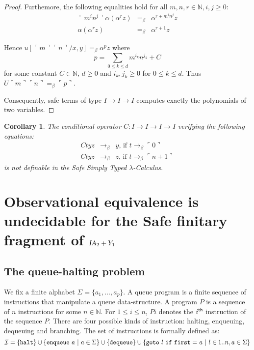 \documentclass{article}
\newtheorem{corollary}[theorem]{Corollary}
\newcommand{\encode}[1]{\ulcorner #1 \urcorner}
\newcommand{\nat}{\mathbb{N}}
\newcommand\ialgol{{\textsl{IA}}}
\begin{document}
\begin{proof}
Furthemore, the following equalities hold for all $m,n,r\in \nat,i,j\geq 0$:
\begin{eqnarray*}
\encode{m^i n^j} \alpha (\alpha^r z) &=_\beta&
\alpha^{r + m^i n^j} z \\
\alpha ( \alpha^r z ) &=_\beta& \alpha^{r+1} z
\end{eqnarray*}

Hence $u[\encode{m} \encode{n}/x,y] =_\beta \alpha^p z$ where
$$ p = \sum_{0\leq k \leq d} m^{i_k} n^{j_k} + C$$
for some constant $C \in \nat$, $d\geq 0$ and $i_k,j_k \geq 0$ for $0 \leq k \leq d$. Thus $U \encode{m} \encode{n} =_\beta \encode{p}$. 

Consequently, safe terms of type $I \rightarrow I \rightarrow I$ computes
exactly the polynomials of two variables.
\end{proof}

\begin{corollary}
The conditional operator $C:I\rightarrow I\rightarrow I \rightarrow I$ verifying the following equations:
\begin{eqnarray*}
C t y z &\rightarrow_\beta& y \mbox{, if } t \rightarrow_\beta \encode{0} \\
C t y z &\rightarrow_\beta& z \mbox{, if } t \rightarrow_\beta \encode{n+1}
\end{eqnarray*}
is not definable in the Safe Simply Typed $\lambda$-Calculus.
\end{corollary}



\section{Observational equivalence is undecidable for the Safe finitary fragment of $\ialgol_2 + Y_1$}

\subsection{The queue-halting problem}
We fix a finite alphabet $\Sigma = \{ a_1, \ldots, a_p \}$. A queue program is a finite sequence of instructions that manipulate a queue data-structure. 
A program $P$ is a sequence of $n$ instructions for some $n\in \nat$. For $1 \leq i \leq n$, $P i$ denotes the $i^{\sf th}$ instruction of the sequence $P$. There are four possible kinds of instruction: halting, enqueuing, dequeuing and branching. The set of instructions is formally defined as:
$$ \mathcal{I} = \{ {\tt halt} \} \cup
\{ {\tt enqueue \ } a \ | \ a \in \Sigma \}
\cup \{ {\tt dequeue} \} \cup \{ {\tt goto\ } l {\tt\ if\ first =\ } a \ | \ l \in 1..n, a \in \Sigma \}
 $$
\end{document}
